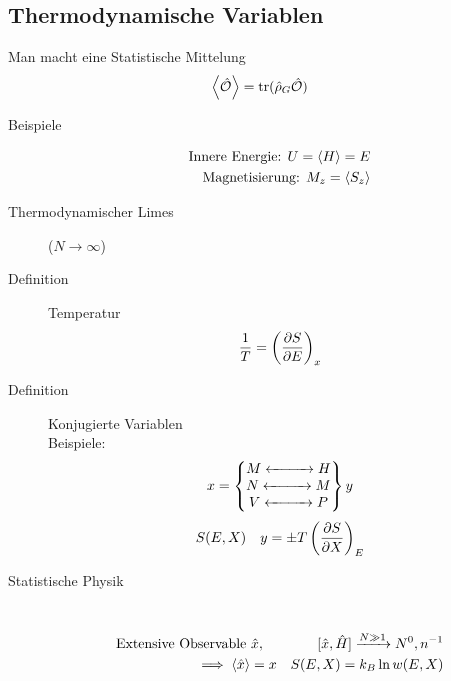  \subsection*{Thermodynamische Variablen}
 Man macht eine Statistische Mittelung
 \begin{align*}
   \Braket{\hat{\cal{O}}} = \operatorname{tr} (\hat{\rho}_G \hat{\cal{O}})
 \end{align*}
 \begin{description}
   \item[Beispiele] 
     \begin{align*}
      \text{Innere Energie: } U= \Braket{H} = E \\
      \text{Magnetisierung: } M_z = \Braket{S_z} \\
     \end{align*}
   \item[Thermodynamischer Limes] ($N \to \infty$)
   \item[Definition] Temperatur
     \begin{align*}
       \frac{1}{T} = \left( \frac{\partial S }{\partial E} \right)_x
     \end{align*}
   \item[Definition] Konjugierte Variablen \\
     Beispiele: 
     \begin{align*}
       x = \begin{Bmatrix} 
         M \xleftrightarrow{\hspace{1cm}}  H \\ 
         N \xleftrightarrow{\hspace{1cm}}  M \\
         V \xleftrightarrow{\hspace{1cm}} P 
     \end{Bmatrix} y
     \end{align*}
     \begin{align*}
       S(E,X) && y = \pm  T \left( \frac{\partial S }{\partial X} \right)_E
     \end{align*}
   \item[Statistische Physik] $ $ \\
     \begin{align*}
       \text{Extensive Observable } \hat{x}, \quad && [\hat{x}, \hat{H}]
       \xrightarrow{ N \gg 1} N^0, n^{-1} \\
       \implies \Braket{\hat{x}} = x && S(E,X) = k_B \ln{ w(E,X)} \\
     \end{align*}
 \end{description}
